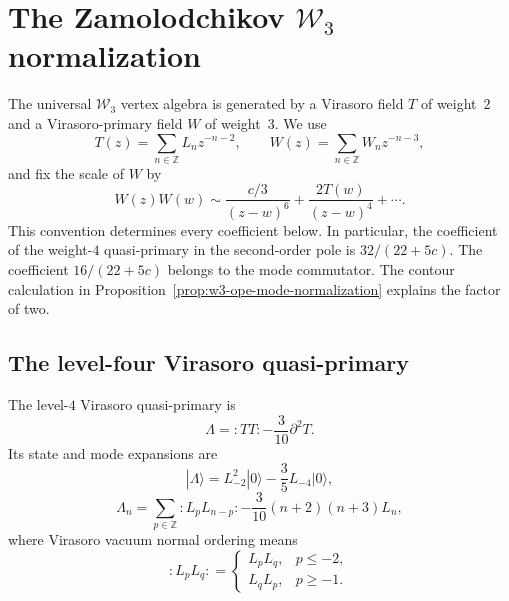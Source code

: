 \providecommand{\BRST}{\mathrm{BRST}}
\providecommand{\BRSTGauged}{\mathrm{BRSTGaugedChirAlg}}
\providecommand{\ClaimStatusComputed}{\textnormal{[computed]}}

\section{The Zamolodchikov \texorpdfstring{$\mathcal W_3$}{W3}
normalization}
\label{sec:w3-composite-complete}

The universal $\mathcal W_3$ vertex algebra is generated by a
Virasoro field $T$ of weight~$2$ and a Virasoro-primary field $W$ of
weight~$3$.  We use
\[
T(z)=\sum_{n\in\mathbb Z}L_nz^{-n-2},\qquad
W(z)=\sum_{n\in\mathbb Z}W_nz^{-n-3},
\]
and fix the scale of $W$ by
\[
W(z)W(w)\sim \frac{c/3}{(z-w)^6}
              +\frac{2T(w)}{(z-w)^4}+\cdots.
\]
This convention determines every coefficient below.  In particular,
the coefficient of the weight-$4$ quasi-primary in the second-order
pole is $32/(22+5c)$.  The coefficient $16/(22+5c)$ belongs to the
mode commutator.  The contour calculation in
Proposition~\ref{prop:w3-ope-mode-normalization} explains the factor
of two.

\subsection{The level-four Virasoro quasi-primary}

\begin{definition}
\label{def:lambda-complete}
The level-$4$ Virasoro quasi-primary is
\begin{equation}\label{eq:lambda-qp}
\Lambda={:}TT{:}-\frac{3}{10}\partial^2T.
\end{equation}
Its state and mode expansions are
\begin{equation}\label{eq:lambda-state}
|\Lambda\rangle
=L_{-2}^2|0\rangle-\frac35L_{-4}|0\rangle,
\end{equation}
\begin{equation}\label{eq:lambda-mode-correct}
\Lambda_n
=\sum_{p\in\mathbb Z}{:}L_pL_{n-p}{:}
-\frac{3}{10}(n+2)(n+3)L_n,
\end{equation}
where Virasoro vacuum normal ordering means
\begin{equation}\label{eq:vir-mode-normal-ordering}
{:}L_pL_q{:}
=
\begin{cases}
L_pL_q,&p\leq-2,\\
L_qL_p,&p\geq-1.
\end{cases}
\end{equation}
\end{definition}

